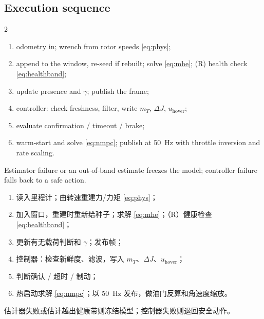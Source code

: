 \documentclass[10pt,a4paper]{article}
\numberwithin{equation}{section}
\newcommand{\dJ}{\Delta J}
\newcommand{\mT}{m_T}
\newcommand{\pair}[2]{\begin{paracol}{2}#1\switchcolumn #2\end{paracol}}
\newcommand{\bsub}[2]{\needspace{8\baselineskip}\subsection{#1\quad{\normalfont #2}}}
\begin{document}
\bsub{Execution sequence}{在线执行流程}
\pair{\begin{enumerate}\setlength\itemsep{0pt}
\item odometry in; wrench from rotor speeds \eqref{eq:phys};
\item append to the window, re-seed if rebuilt; solve \eqref{eq:mhe}; (R) health check \eqref{eq:healthband};
\item update presence and $\gamma$; publish the frame;
\item controller: check freshness, filter, write $\mT$, $\dJ$, $u_{\mathrm{hover}}$;
\item evaluate confirmation / timeout / brake;
\item warm-start and solve \eqref{eq:nmpc}; publish at \SI{50}{\hertz} with throttle inversion and rate scaling.
\end{enumerate}
Estimator failure or an out-of-band estimate freezes the model; controller failure falls back to a safe
action.}
{\begin{enumerate}\setlength\itemsep{0pt}
\item 读入里程计；由转速重建力/力矩 \eqref{eq:phys}；
\item 加入窗口，重建时重新给种子；求解 \eqref{eq:mhe}；（R）健康检查 \eqref{eq:healthband}；
\item 更新有无载荷判断和 $\gamma$；发布帧；
\item 控制器：检查新鲜度、滤波，写入 $\mT$、$\dJ$、$u_{\mathrm{hover}}$；
\item 判断确认 / 超时 / 制动；
\item 热启动求解 \eqref{eq:nmpc}；以 \SI{50}{\hertz} 发布，做油门反算和角速度缩放。
\end{enumerate}
估计器失败或估计越出健康带则冻结模型；控制器失败则退回安全动作。}
\end{document}
